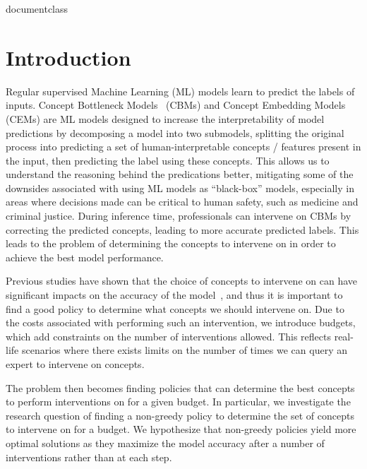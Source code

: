 \csname documentclass

\chapter{Introduction}
\label{firstcontentpage}


Regular supervised Machine Learning (ML) models learn to 
predict the labels of inputs.
Concept Bottleneck Models~\cite{cbm} (CBMs) and Concept Embedding Models~\cite{cem} (CEMs) are 
ML models designed to increase the interpretability of model predictions by decomposing a model into
two submodels, splitting the original process into predicting a set of human-interpretable
concepts / features present in the input, then predicting the label using these concepts.
This allows us to understand the reasoning behind the predications better, 
mitigating some of the downsides associated with using ML models as ``black-box'' models,
especially in areas where 
decisions made can be critical to 
human safety, such as medicine
and criminal justice.
During inference time, professionals can intervene on CBMs by correcting
the predicted concepts, leading to more accurate predicted labels. 
This leads to the problem of determining the concepts to intervene on in order
to achieve the best model performance.

Previous studies have shown that the choice of concepts to 
intervene on can have significant impacts on the accuracy of the model~\cite{coop, intcem},
and thus it is important to find a good policy to determine what concepts
we should intervene on.
Due to the costs
associated with performing such an intervention, we introduce budgets,
which add constraints on the number of interventions allowed. 
This
reflects real-life scenarios where
there exists limits on the number of times we 
can query an expert to intervene on concepts.

The problem then becomes finding policies that can determine the best 
concepts to perform interventions on for a given budget. In particular,
we investigate 
the research question of 
finding a non-greedy policy to determine
the set of concepts to intervene on for a budget.
We hypothesize that non-greedy policies
yield more optimal solutions as they maximize 
the model accuracy after a number of interventions rather than at each step.

